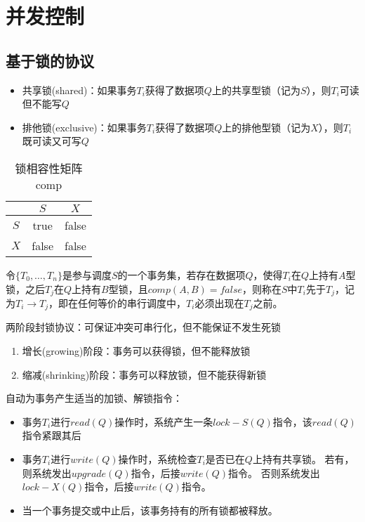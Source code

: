 
\section{并发控制} %
\subsection{基于锁的协议}
\begin{itemize}
	\item 共享锁(shared)：如果事务$T_i$获得了数据项$Q$上的共享型锁（记为$S$），则$T_i$可读但不能写$Q$
	\item 排他锁(exclusive)：如果事务$T_i$获得了数据项$Q$上的排他型锁（记为$X$），则$T_i$既可读又可写$Q$
\end{itemize}

\begin{table}
\centering
\caption{锁相容性矩阵comp}
\begin{tabular}{|c|c|c|}\hline
 & $S$ & $X$\\\hline
$S$ & true & false\\\hline
$X$ & false & false\\\hline
\end{tabular}
\end{table}

令$\{T_0,\ldots,T_n\}$是参与调度$S$的一个事务集，若存在数据项$Q$，使得$T_i$在$Q$上持有$A$型锁，之后$T_j$在$Q$上持有$B$型锁，且$comp(A,B)=false$，则称在$S$中$T_i$先于$T_j$，记为$T_i\to T_j$，即在任何等价的串行调度中，$T_i$必须出现在$T_j$之前。

两阶段封锁协议：可保证冲突可串行化，但不能保证不发生死锁
\begin{enumerate}
	\item 增长(growing)阶段：事务可以获得锁，但不能释放锁
	\item 缩减(shrinking)阶段：事务可以释放锁，但不能获得新锁
\end{enumerate}

自动为事务产生适当的加锁、解锁指令：
\begin{itemize}
	\item 事务$T_i$进行$read(Q)$操作时，系统产生一条$lock-S(Q)$指令，该$read(Q)$指令紧跟其后
	\item 事务$T_i$进行$write(Q)$操作时，系统检查$T_i$是否已在$Q$上持有共享锁。
	若有，则系统发出$upgrade(Q)$指令，后接$write(Q)$指令。
	否则系统发出$lock-X(Q)$指令，后接$write(Q)$指令。
	\item 当一个事务提交或中止后，该事务持有的所有锁都被释放。
\end{itemize}

